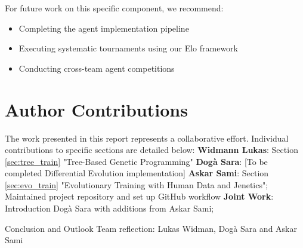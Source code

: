 \documentclass[sigconf]{acmart} %
\begin{document}
For future work on this specific component, we recommend:
\begin{itemize}
	\item Completing the agent implementation pipeline
	\item Executing systematic tournaments using our Elo framework
	\item Conducting cross-team agent competitions
\end{itemize}

\section{Author Contributions}
The work presented in this report represents a collaborative effort. Individual contributions to specific sections are detailed below:
\textbf{Widmann Lukas}: Section \ref{sec:tree_train} "Tree-Based Genetic Programming"
\newline \textbf{Dogà Sara}: [To be completed Differential Evolution implementation] 
\newline \textbf{Askar Sami}: Section \ref{sec:evo_train} "Evolutionary Training with Human Data and Jenetics"; Maintained project repository and set up GitHub workflow \cite{rmb_github} \newline
	 \textbf{Joint Work}: Introduction Dogà Sara with additions from Askar Sami;
	 
	  Conclusion and Outlook Team reflection: Lukas Widman, Dogà Sara and Askar Sami




\end{document}
